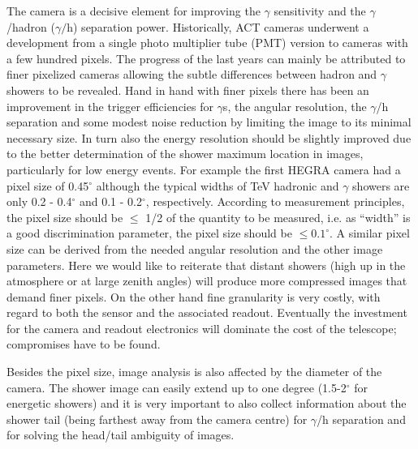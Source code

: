\medskip The camera is a decisive element for improving the $\gamma $
sensitivity and the $\gamma $/hadron ($\gamma /$h) separation power.
Historically, ACT cameras underwent a development from a single 
photo multiplier tube (PMT)
version to cameras with a few hundred pixels. The progress of the last years
can mainly be attributed to finer pixelized cameras allowing the subtle
differences between hadron and $\gamma $ showers to be revealed. Hand in
hand with finer pixels there has been an improvement in 
the trigger efficiencies for $\gamma$s, 
the angular resolution,
the $\gamma $/h separation and some modest noise reduction by limiting the
image to its minimal necessary size. In turn also the energy resolution
should be slightly improved
due to the better determination of the shower maximum location
in images, particularly for low energy events. For example
the first HEGRA camera had a pixel size of 0.45$^{\circ }$ although the
typical widths of TeV hadronic and $\gamma $ showers are only 0.2 - 0.4$^{\circ
} $ and 0.1 - 0.2$^{\circ }$, respectively. According to measurement
principles, the pixel size should be $\leq $ 1/2 of the quantity to be
measured, i.e. as ``width'' is a good discrimination parameter, the pixel
size should be $\leq 0.1^{\circ }$. A similar pixel size can be derived from
the needed angular resolution and the other image parameters. Here we would
like to reiterate that distant showers (high up in the atmosphere or at
large zenith angles) will produce more compressed images that demand finer
pixels. On the other hand fine granularity is very costly, with regard to
both the sensor and the associated readout. Eventually the investment for
the camera and readout electronics will dominate the cost of the telescope;
compromises have to be found.

Besides the pixel size, image analysis is also affected by the diameter of
the camera. The shower image can easily extend up to one degree (1.5-2$%
^\circ $ for energetic showers) and it is very important to also collect
information about the shower tail (being farthest away from the camera
centre) for $\gamma$/h separation and for solving the head/tail ambiguity
of images.

